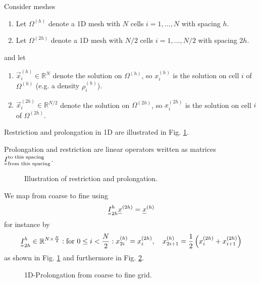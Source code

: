 
Consider meshes
\begin{enumerate}
    \item Let $\Omega^{(h)}$ denote a 1D mesh with $N$ cells $i=1,\dots,N$ with spacing $h$.
    \item Let $\Omega^{(2h)}$ denote a 1D mesh with $N/2$ cells $i=1,\dots,N/2$ with spacing $2h$.
\end{enumerate}
and let
\begin{enumerate}
    \item $\vec{x}^{(h)}_i \in \mathbb{R}^{N}$ denote the solution on $\Omega^{(h)}$, so $x^{(h)}_i$ is the solution on cell $i$ of $\Omega^{(h)}$ (e.g. a density $\rho^{(h)}_i$).
    \item $\vec{x}^{(2h)}_i \in \mathbb{R}^{N/2}$ denote the solution on $\Omega^{(2h)}$, so $x^{(2h)}_i$ is the solution on cell $i$ of $\Omega^{(2h)}$.
\end{enumerate}

Restriction and prolongation in 1D are illustrated in Fig. \ref{fig:pro_res_ill}.

Prolongation and restriction are linear operators written as matrices $\mat{I}_{\text{from this spacing}}^{\text{to this spacing}}$.

\begin{figure}[H]
    \centering
    
    \caption{Illustration of restriction and prolongation.}
    \label{fig:pro_res_ill}
\end{figure}

We map from coarse to fine using
\begin{equation}
    \mat{I}_{2h}^h \vec{x}^{(2h)} = \vec{x}^{(h)}
\end{equation}
for instance by
\begin{equation}
    \mat{I}_{2h}^h \in \mathbb{R}^{N \times \frac{N}{2}}: \text{for } 0 \leq i < \frac{N}{2}: x_{2i}^{(h)} = x_i^{(2h)}, \quad x_{2i+1}^{(h)} = \frac{1}{2} \left( x_i^{(2h)} + x_{i+1}^{(2h)} \right)
\end{equation}
as shown in Fig. \ref{fig:pro_res_ill} and furthermore in Fig. \ref{fig:prolongation}.

\begin{figure}[H]
    \centering
    
    \caption{1D-Prolongation from coarse to fine grid.}
    \label{fig:prolongation}
\end{figure}

